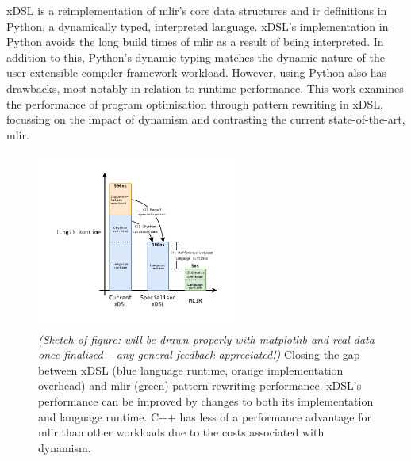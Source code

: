 
xDSL \cite{fehrXDSLSidekickCompilation2025} is a reimplementation of \ac{mlir}'s core data structures and \ac{ir} definitions in Python, a dynamically typed, interpreted language.
xDSL's implementation in Python avoids the long build times of \ac{mlir} as a result of being interpreted. %
In addition to this, Python's dynamic typing matches the dynamic nature of the user-extensible compiler framework workload.
However, using Python also has drawbacks, most notably in relation to runtime performance.
This work examines the performance of program optimisation through pattern rewriting in xDSL, focussing on the impact of dynamism and contrasting the current state-of-the-art, \ac{mlir}.







\begin{figure}
    \centering
    \includegraphics[width=0.6\textwidth]{images/introduction/narrative.drawio.pdf}
    \caption{\textit{(Sketch of figure: will be drawn properly with matplotlib and real data once finalised -- any general feedback appreciated!)} Closing the gap between xDSL (blue language runtime, orange implementation overhead) and \ac{mlir} (green) pattern rewriting performance. xDSL's performance can be improved by changes to both its implementation and language runtime. C++ has less of a performance advantage for \ac{mlir} than other workloads due to the costs associated with dynamism.}
    \label{fig:narrative}
\end{figure}


